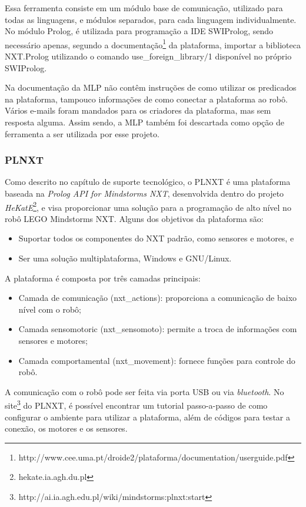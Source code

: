 Essa ferramenta consiste em um módulo base de comunicação, utilizado para todas as linguagens, e módulos separados, para cada linguagem individualmente. No módulo Prolog, é utilizada para programação a IDE SWIProlog, sendo necessário apenas, segundo a documentação\footnote{http://www.cee.uma.pt/droide2/plataforma/documentation/userguide.pdf} da plataforma, importar a biblioteca NXT.Prolog utilizando o comando use\_foreign\_library$/$1 disponível no próprio SWIProlog. 

Na documentação da MLP não contêm instruções de como utilizar os predicados na plataforma, tampouco informações de como conectar a plataforma ao robô. Vários e-mails foram mandados para os criadores da plataforma, mas sem resposta alguma. Assim sendo, a MLP também foi descartada como opção de ferramenta a ser utilizada por esse projeto.

\subsubsection[PLNXT]{PLNXT}
Como descrito no capítulo de suporte tecnológico, o PLNXT é uma plataforma baseada na \textit{Prolog API for Mindstorms NXT}, desenvolvida dentro do projeto \textit{HeKatE}\footnote{hekate.ia.agh.du.pl}, e visa proporcionar uma solução para a programação de alto nível no robô LEGO Mindstorms NXT. Alguns dos objetivos da plataforma são:
\begin{itemize}
\item Suportar todos os componentes do NXT padrão, como sensores e motores, e
\item Ser uma solução multiplataforma, Windows e GNU/Linux.
\end{itemize}
A plataforma é composta por três camadas principais:
\begin{itemize}
\item Camada de comunicação (nxt\_actions): proporciona a comunicação de baixo nível com o robô;
\item Camada sensomotoric (nxt\_sensomoto): permite a troca de informações com sensores e motores;
\item Camada comportamental (nxt\_movement): fornece funções para controle do robô.
\end{itemize}
A comunicação com o robô pode ser feita via porta USB ou via \textit{bluetooth}. No site\footnote{http://ai.ia.agh.edu.pl/wiki/mindstorms:plnxt:start} do PLNXT, é possível encontrar um tutorial passo-a-passo de como configurar o ambiente para utilizar a plataforma, além de códigos para testar a conexão, os motores e os sensores.

